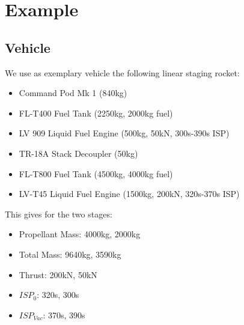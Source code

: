 \documentclass[11pt]{report}
\begin{document}
\chapter{Example}

\section{Vehicle}

We use as exemplary vehicle the following linear staging rocket:

\begin{itemize}
\item Command Pod Mk 1 (840kg)
\item FL-T400 Fuel Tank (2250kg, 2000kg fuel)
\item LV 909 Liquid Fuel Engine (500kg, 50kN, 300s-390s ISP)
\item TR-18A Stack Decoupler (50kg)
\item FL-T800 Fuel Tank (4500kg, 4000kg fuel)
\item LV-T45 Liquid Fuel Engine (1500kg, 200kN, 320s-370s ISP)
\end{itemize}

This gives for the two stages:

\begin{itemize}
\item Propellant Mass: 4000kg, 2000kg
\item Total Mass: 9640kg, 3590kg
\item Thrust: 200kN, 50kN
\item $ISP_0$: 320s, 300s
\item $ISP_{Vac}$: 370s, 390s
\end{itemize}
\end{document}
